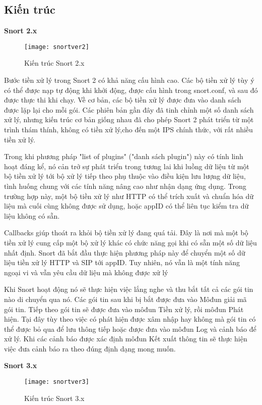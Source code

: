 \subsection{Kiến trúc}
\textbf{Snort 2.x}
\begin{figure}[!htbp]
    \centering
    \texttt{[image: snortver2]}
    \caption{Kiến trúc Snort 2.x}
    \label{fig:x cubed graph}
\end{figure}
\FloatBarrier
Bước tiền xử lý trong Snort 2 có khả năng cấu hình cao. Các bộ tiền xử lý tùy ý có thể được nạp tự động khi khởi động, được cấu hình trong snort.conf, và sau đó được thực thi khi chạy.
Về cơ bản, các bộ tiền xử lý được đưa vào danh sách được lặp lại cho mỗi gói. 
Các phiên bản gần đây đã tinh chỉnh một số danh sách xử lý, nhưng kiến trúc cơ bản giống nhau đã cho phép Snort 2 phát triển từ một trình thám thính, không có tiền xử lý,cho đến một IPS chính thức, với rất nhiều tiền xử lý.
\par
Trong khi phương pháp "list of plugins" ("danh sách plugin") này có tính linh hoạt đáng kể, nó cản trở sự phát triển trong tương lai khi luồng dữ liệu từ một bộ tiền xử lý tới bộ xử lý tiếp theo phụ thuộc vào điều kiện lưu lượng dữ liệu, tình huống chung với các tính năng nâng cao như nhận dạng ứng dụng. 
Trong trường hợp này, một bộ tiền xử lý như HTTP có thể trích xuất và chuẩn hóa dữ liệu mà cuối cùng không được sử dụng, hoặc appID có thể liên tục kiểm tra dữ liệu không có sẵn.
\par
Callbacks giúp thoát ra khỏi bộ tiền xử lý đang quá tải. Đây là nơi mà một bộ tiền xử lý cung cấp một bộ xử lý khác có chức năng gọi khi có sẵn một số dữ liệu nhất định. 
Snort đã bắt đầu thực hiện phương pháp này để chuyển một số dữ liệu tiền xử lý HTTP và SIP tới appID. 
Tuy nhiên, nó vẫn là một tính năng ngoại vi và vẫn yêu cầu dữ liệu mà không được xử lý
\par
Khi Snort hoạt động nó sẽ thực hiện việc lắng nghe và thu bắt tất cả các gói tin nào di chuyển qua nó. Các gói tin sau khi bị bắt được đưa vào Môđun giải mã gói tin. 
Tiếp theo gói tin sẽ được đưa vào môđun Tiền xử lý, rồi môđun Phát hiện. 
Tại đây tùy theo việc có phát hiện được xâm nhập hay không mà gói tin có thể được bỏ qua để lưu thông tiếp hoặc được đưa vào môđun Log và cảnh báo để xử lý. Khi các cảnh báo được xác định môđun Kết xuất thông tin sẽ thực hiện việc đưa cảnh báo ra theo đúng định dạng mong muốn.
\newline
\par
\textbf{Snort 3.x}
\begin{figure}[!htbp]
    \centering
    \texttt{[image: snortver3]}
    \caption{Kiến trúc Snort 3.x}
    \label{fig:x cubed graph}
\end{figure}
